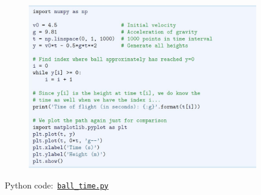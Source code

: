 \documentclass[english,14pt]{beamer}
\begin{document}

\begin{frame}[fragile]

\frametitle{}

\begin{figure}[ht]
	\centering
	\includegraphics[width=0.9\textwidth]{figures/LLp65a}
\end{figure}
\vspace*{-3mm}
Python code:~\href{https://github.com/slgit/prog4comp_2/blob/master/py36-src/ball_time.py}{\texttt{ball\_time.py}}

\end{frame}

\end{document}
